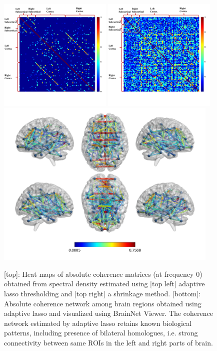 \begin{figure}
    \centering
    \includegraphics[width=0.48\textwidth]{img/al_hm_nl.pdf}
    \includegraphics[width=0.48\textwidth]{img/sh_hm_nl.pdf}
    \includegraphics[width=0.95\textwidth]{img/al_c.jpg}
    \caption{[top]: Heat maps of absolute coherence matrices (at frequency $0$) obtained from  spectral density estimated using [top left] adaptive lasso thresholding  and [top right] a shrinkage method. [bottom]: Absolute coherence network among brain regions obtained using adaptive lasso and visualized using BrainNet Viewer. The coherence network estimated by adaptive lasso retains known biological patterns, including presence of bilateral homologues, i.e. strong connectivity between same ROIs in the left and right parts of brain.}
    \label{fig:realdata}
\end{figure}


